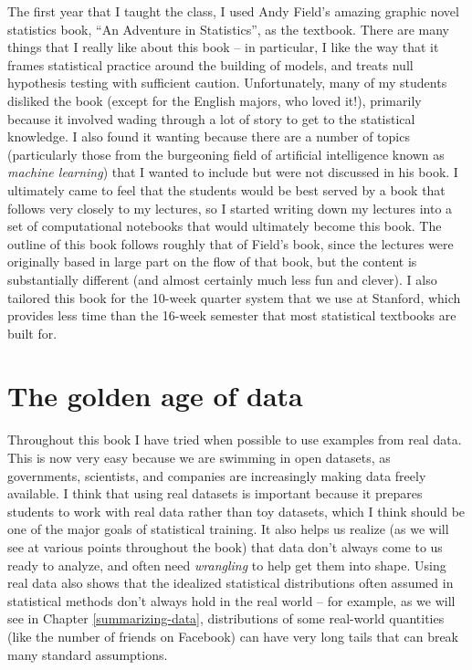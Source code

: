 \documentclass[
  12pt,
]{book}
\begin{document}
The first year that I taught the class, I used Andy Field's amazing graphic novel statistics book, ``An Adventure in Statistics'', as the textbook. There are many things that I really like about this book -- in particular, I like the way that it frames statistical practice around the building of models, and treats null hypothesis testing with sufficient caution. Unfortunately, many of my students disliked the book (except for the English majors, who loved it!), primarily because it involved wading through a lot of story to get to the statistical knowledge. I also found it wanting because there are a number of topics (particularly those from the burgeoning field of artificial intelligence known as \emph{machine learning}) that I wanted to include but were not discussed in his book. I ultimately came to feel that the students would be best served by a book that follows very closely to my lectures, so I started writing down my lectures into a set of computational notebooks that would ultimately become this book. The outline of this book follows roughly that of Field's book, since the lectures were originally based in large part on the flow of that book, but the content is substantially different (and almost certainly much less fun and clever). I also tailored this book for the 10-week quarter system that we use at Stanford, which provides less time than the 16-week semester that most statistical textbooks are built for.

\hypertarget{the-golden-age-of-data}{%
\section{The golden age of data}\label{the-golden-age-of-data}}

Throughout this book I have tried when possible to use examples from real data. This is now very easy because we are swimming in open datasets, as governments, scientists, and companies are increasingly making data freely available. I think that using real datasets is important because it prepares students to work with real data rather than toy datasets, which I think should be one of the major goals of statistical training. It also helps us realize (as we will see at various points throughout the book) that data don't always come to us ready to analyze, and often need \emph{wrangling} to help get them into shape. Using real data also shows that the idealized statistical distributions often assumed in statistical methods don't always hold in the real world -- for example, as we will see in Chapter \ref{summarizing-data}, distributions of some real-world quantities (like the number of friends on Facebook) can have very long tails that can break many standard assumptions.
\end{document}
